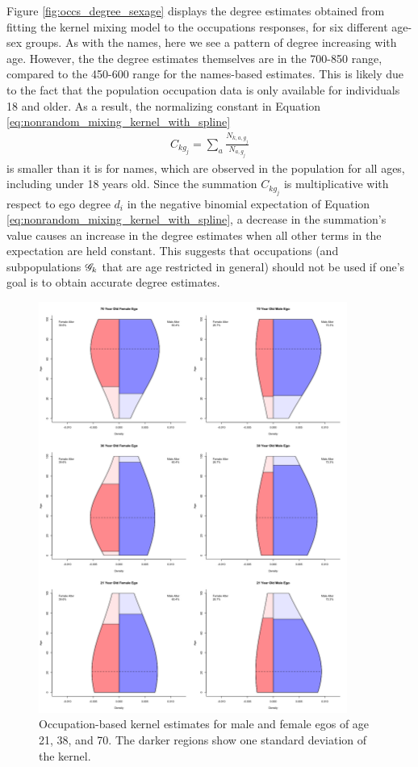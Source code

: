 Figure \ref{fig:occs_degree_sexage} displays the degree estimates obtained from fitting the kernel mixing model to the occupations responses, for six different age-sex groups. As with the names, here we see a pattern of degree increasing with age. However, the the degree estimates themselves are in the 700-850 range, compared to the 450-600 range for the names-based estimates. This is likely due to the fact that the population occupation data is only available for individuals 18 and older. As a result, the normalizing constant in Equation \ref{eq:nonrandom_mixing_kernel_with_spline}
\begin{align}
C_{kg_j} = \sum_a \frac{N_{k,a, g_j}}{N_{a,g_j}} \label{eq:kernel_normalizing_constant}
\end{align}
is smaller than it is for names, which are observed in the population for all ages, including under 18 years old. Since the summation $C_{kg_j}$ is multiplicative with respect to ego degree $d_i$ in the negative binomial expectation of Equation \ref{eq:nonrandom_mixing_kernel_with_spline}, a decrease in the summation's value causes an increase in the degree estimates when all other terms in the expectation are held constant. This suggests that occupations (and subpopulations $\mathcal{G}_k$ that are age restricted in general) should not be used if one's goal is to obtain accurate degree estimates.

\begin{figure}
\includegraphics[width=0.9\textwidth]{figures/kernel/occs/kern_sexage.png}
\caption{Occupation-based kernel estimates for male and female egos of age 21, 38, and 70. The darker regions show one standard deviation of the kernel.}
\label{fig:occs_kernel_sexage}
\end{figure}

